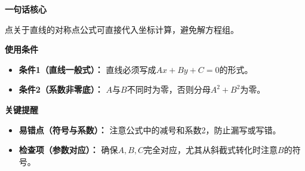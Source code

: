 \begin{summarybox}
	\textbf{\textcolor{CSummary}{一句话核心}}

	点关于直线的对称点公式可直接代入坐标计算，避免解方程组。

	\medskip
	\textbf{\textcolor{CSummary}{使用条件}}
	\begin{itemize}[leftmargin=*, itemsep=0.5em, topsep=0.4em]
		\item \textbf{条件1（直线一般式）：} 直线必须写成$Ax+By+C=0$的形式。
		\item \textbf{条件2（系数非零底）：} $A$与$B$不同时为零，否则分母$A^2+B^2$为零。
	\end{itemize}

	\medskip
	\textbf{\textcolor{CSummary}{关键提醒}}
	\begin{itemize}[leftmargin=*, itemsep=0.5em, topsep=0.4em]
		\item \textbf{易错点（符号与系数）：} 注意公式中的减号和系数2，防止漏写或写错。
		\item \textbf{检查项（参数对应）：} 确保$A,B,C$完全对应，尤其从斜截式转化时注意$B$的符号。
	\end{itemize}
\end{summarybox}
